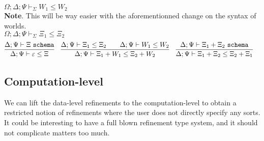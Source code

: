 \documentclass[letterpaper, 11pt]{article}
\newcommand{\schema}{\texttt{schema}}
\begin{document}
    $\boxed{\Omega; \Delta; \Psi \vdash_\Sigma W_1 \leq W_2}$ \\
    
    \textbf{Note}.  This will be way easier with the aforementionned change on the syntax of worlds.\\

    $\boxed{\Omega; \Delta; \Psi \vdash_\Sigma \Xi_1 \leq \Xi_2}$
    \begin{align*}
      & \infer{\Delta; \Psi \vdash \varepsilon \leq \Xi}{\Delta; \Psi \vdash \Xi \ \schema} &
      & \infer{\Delta; \Psi \vdash \Xi_1 + W_1 \leq \Xi_2 + W_2}
        {
          \Delta; \Psi \vdash \Xi_1 \leq \Xi_2
          &&
          \Delta; \Psi \vdash W_1 \leq W_2
        } &
      & \infer{\Delta; \Psi \vdash \Xi_1 + \Xi_2 \leq \Xi_2 + \Xi_1}{\Delta; \Psi \vdash \Xi_1 + \Xi_2 \ \schema}
    \end{align*}

    \subsection{Computation-level}
    We can lift the data-level refinements to the computation-level to obtain a restricted notion of refinements where the user does not directly
    specify any sorts.  It could be interesting to have a full blown refinement type system, and it should not complicate matters too much.
\end{document}
